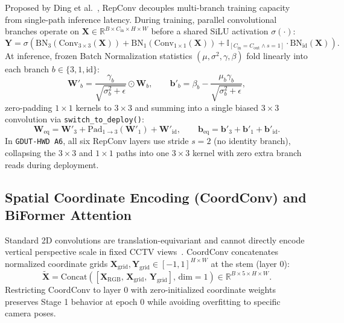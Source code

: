 Proposed by Ding et al.~\cite{ding2021repvgg}, RepConv decouples multi-branch training capacity from single-path inference latency. During training, parallel convolutional branches operate on $\mathbf{X} \in \mathbb{R}^{B \times C_{\text{in}} \times H \times W}$ before a shared SiLU activation $\sigma(\cdot)$:
\begin{equation}
\mathbf{Y} = \sigma\!\left(\mathrm{BN}_3(\mathrm{Conv}_{3\times 3}(\mathbf{X})) + \mathrm{BN}_1(\mathrm{Conv}_{1\times 1}(\mathbf{X})) + \mathbb{I}_{[C_{\text{in}}=C_{\text{out}} \land s=1]} \cdot \mathrm{BN}_{\text{id}}(\mathbf{X})\right).
\label{eq:sota_repconv_train}
\end{equation}
At inference, frozen Batch Normalization statistics $(\mu, \sigma^2, \gamma, \beta)$ fold linearly into each branch $b \in \{3, 1, \text{id}\}$:
\begin{equation}
\mathbf{W}'_b = \frac{\gamma_b}{\sqrt{\sigma_b^2 + \epsilon}} \odot \mathbf{W}_b, \qquad \mathbf{b}'_b = \beta_b - \frac{\mu_b \gamma_b}{\sqrt{\sigma_b^2 + \epsilon}},
\label{eq:sota_bn_fold}
\end{equation}
zero-padding $1 \times 1$ kernels to $3 \times 3$ and summing into a single biased $3 \times 3$ convolution via \nolinkurl{switch_to_deploy()}:
\begin{equation}
\mathbf{W}_{\text{eq}} = \mathbf{W}'_3 + \mathrm{Pad}_{1 \to 3}(\mathbf{W}'_1) + \mathbf{W}'_{\text{id}}, \qquad \mathbf{b}_{\text{eq}} = \mathbf{b}'_3 + \mathbf{b}'_1 + \mathbf{b}'_{\text{id}}.
\label{eq:sota_repconv_fuse}
\end{equation}
In \texttt{GDUT-HWD A6}, all six RepConv layers use stride $s = 2$ (no identity branch), collapsing the $3 \times 3$ and $1 \times 1$ paths into one $3 \times 3$ kernel with zero extra branch reads during deployment.

\subsection{Spatial Coordinate Encoding (CoordConv) and BiFormer Attention}

Standard 2D convolutions are translation-equivariant and cannot directly encode vertical perspective scale in fixed CCTV views~\cite{liu2018coordconv}. CoordConv concatenates normalized coordinate grids $\mathbf{X}_{\text{grid}}, \mathbf{Y}_{\text{grid}} \in [-1, 1]^{H \times W}$ at the stem (layer 0):
\begin{equation}
\tilde{\mathbf{X}} = \mathrm{Concat}\!\left([\mathbf{X}_{\text{RGB}}, \, \mathbf{X}_{\text{grid}}, \, \mathbf{Y}_{\text{grid}}], \, \text{dim}=1\right) \in \mathbb{R}^{B \times 5 \times H \times W}.
\label{eq:sota_coordconv}
\end{equation}
Restricting CoordConv to layer 0 with zero-initialized coordinate weights preserves Stage 1 behavior at epoch 0 while avoiding overfitting to specific camera poses.

